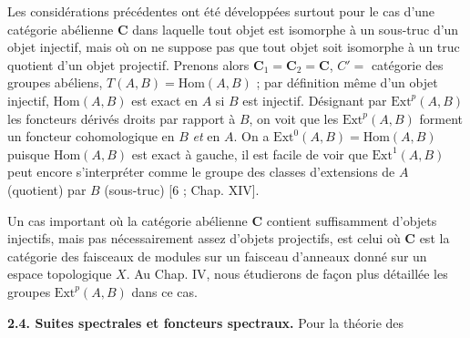 Les considérations précédentes ont été développées surtout pour le cas d'une
catégorie abélienne $\mathbf{C}$ dans laquelle tout objet est isomorphe à un sous-truc
d'un objet injectif, mais où on ne suppose pas que tout objet soit isomorphe à
un truc quotient d'un objet projectif. Prenons alors $\mathbf{C}_1=\mathbf{C}_2=\mathbf{C}$, $C'=$
catégorie des groupes abéliens, $T(A,B)=\mathrm{Hom}(A,B)$ ; par définition
même d'un objet injectif, $\mathrm{Hom}(A,B)$ est exact en $A$ si $B$ est
injectif. Désignant par $\mathrm{Ext}^p(A,B)$ les foncteurs dérivés droits par
rapport à $B$, on voit que les $\mathrm{Ext}^p(A,B)$ forment un foncteur
cohomologique en $B$ \textit{et} en $A$. On a
$\mathrm{Ext}^0(A,B)=\mathrm{Hom}(A,B)$ puisque $\mathrm{Hom}(A,B)$ est exact
à gauche, il est facile de voir que $\mathrm{Ext}^1(A,B)$ peut encore
s'interpréter comme le groupe des classes d'extensions de $A$ (quotient) par
$B$ (sous-truc) [6 ; Chap. XIV].

Un cas important où la catégorie abélienne $\mathbf{C}$ contient suffisamment d'objets
injectifs, mais pas nécessairement assez d'objets projectifs, est celui où $\mathbf{C}$ est la
catégorie des faisceaux de modules sur un faisceau d'anneaux donné sur un
espace topologique $X$. Au Chap. IV, nous étudierons de façon plus détaillée
les groupes $\mathrm{Ext}^p(A,B)$ dans ce cas.

\textbf{2.4. Suites spectrales et foncteurs spectraux.} Pour la
théorie des


